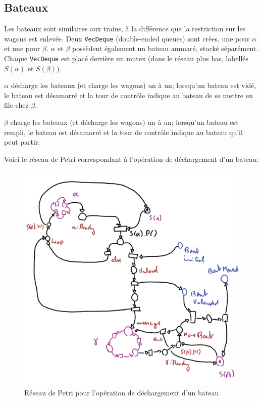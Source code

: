 \documentclass[12pt]{article}
\begin{document}
\subsection{Bateaux}

Les bateaux sont similaires aux trains, à la différence que la restriction sur les wagons est enlevée.
Deux \texttt{VecDeque} (double-ended queues) sont crées, une pour $\alpha$ et une pour $\beta$. $\alpha$ et $\beta$ possèdent également un bateau ammaré, stocké séparément.
Chaque \texttt{VecDeque} est placé derrière un mutex (dans le réseau plus bas, labellés $S(\alpha)$ et $S(\beta)$).

$\alpha$ décharge les bateaux (et charge les wagons) un à un; lorsqu'un bateau est vidé, le bateau est désamarré et la tour de contrôle indique au bateau de se mettre en file chez $\beta$.

$\beta$ charge les bateaux (et décharge les wagons) un à un; lorsqu'un bateau est rempli, le bateau est désamarré et la tour de contrôle indique au bateau qu'il peut partir.

Voici le réseau de Petri correspondant à l'opération de déchargement d'un bateau:

\begin{figure}[H]
    \includegraphics[width=0.95\columnwidth]{boat.png}
    \caption{Réseau de Petri pour l'opération de déchargement d'un bateau\label{fig:petri-boat}}
\end{figure}
\end{document}
